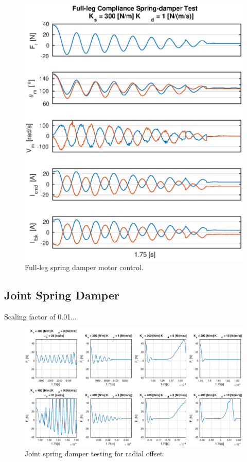 \begin{figure}
\centering
\includegraphics[width=1\textwidth]{images/experiments/full-leg-spring-damper-control-output.eps} 
\caption{Full-leg spring damper motor control.}
\label{fig:full-leg-spring-damper-motor-control}
\end{figure}

\subsection{Joint Spring Damper}

Scaling factor of 0.01...
\begin{figure}
\centering
\includegraphics[width=1\textwidth]{images/experiments/joint-spring-damper-tests.eps} 
\caption{Joint spring damper testing for radial offset.}
\label{fig:joint-spring-damper-tests}
\end{figure}

